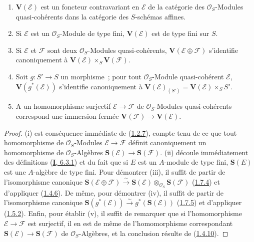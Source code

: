 \begin{proposition}[1.7.11]
\label{II.1.7.11-fr}
\begin{enumerate}
  \item[\rm(i)] $\mathbf{V}(\mathcal{E})$ est un foncteur contravariant en
    $\mathcal{E}$ de la catégorie des $\mathcal{O}_S$-Modules
    quasi-cohérents dans la catégorie des $S$-schémas affines.
  \item[\rm(ii)] Si $\mathcal{E}$ est un $\mathcal{O}_S$-Module de type
    fini, $\mathbf{V}(\mathcal{E})$ est de type fini sur $S$.
  \item[\rm(iii)] Si $\mathcal{E}$ et $\mathcal{F}$ sont deux
    $\mathcal{O}_S$-Modules quasi-cohérents,
    $\mathbf{V}(\mathcal{E}\oplus\mathcal{F})$ s'identifie canoniquement à
    $\mathbf{V}(\mathcal{E})\times_S\mathbf{V}(\mathcal{F})$.
  \item[\rm(iv)] Soit $g:S'\to S$ un morphisme~; pour tout
    $\mathcal{O}_S$-Module quasi-cohérent $\mathcal{E}$,
    $\mathbf{V}(g^*(\mathcal{E}))$ s'identifie canoniquement à
    $\mathbf{V}(\mathcal{E})_{(S')}
    =\mathbf{V}(\mathcal{E})\times_S S'$.
  \item[\rm(v)] A un homomorphisme surjectif
    $\mathcal{E}\to\mathcal{F}$ de $\mathcal{O}_S$-Modules quasi-cohérents
    correspond une immersion fermée
    $\mathbf{V}(\mathcal{F})\to\mathbf{V}(\mathcal{E})$.
\end{enumerate}
\end{proposition}

\begin{proof}
(i) est conséquence immédiate de
(\hyperref[II.1.2.7-fr]{1.2.7}), compte tenu de ce que tout homomorphisme de
$\mathcal{O}_S$-Modules $\mathcal{E}\to\mathcal{F}$ définit canoniquement un
homomorphisme de $\mathcal{O}_S$-Algèbres
$\mathbf{S}(\mathcal{E})\to\mathbf{S}(\mathcal{F})$. (ii) découle
immédiatement des définitions (\hyperref[I.6.3.1-fr]{\textbf{I}, 6.3.1}) et du fait
que si $E$ est un $A$-module de type fini, $\mathbf{S}(E)$ est une
$A$-algèbre de type fini. Pour démontrer (iii), il suffit de partir de
l'isomorphisme canonique
$\mathbf{S}(\mathcal{E}\oplus\mathcal{F})
\xrightarrow{\sim}\mathbf{S}(\mathcal{E})
\otimes_{\mathcal{O}_S}\mathbf{S}(\mathcal{F})$
(\hyperref[II.1.7.4-fr]{1.7.4}) et d'appliquer
(\hyperref[II.1.4.6-fr]{1.4.6}). De même, pour démontrer (iv), il suffit de
partir de l'isomorphisme canonique
$\mathbf{S}(g^*(\mathcal{E}))
\xrightarrow{\sim} g^*(\mathbf{S}(\mathcal{E}))$
(\hyperref[II.1.7.5-fr]{1.7.5}) et d'appliquer
(\hyperref[II.1.5.2-fr]{1.5.2}). Enfin, pour établir (v), il suffit de
remarquer que si l'homomorphisme $\mathcal{E}\to\mathcal{F}$ est surjectif,
il en est de même de l'homomorphisme correspondant
$\mathbf{S}(\mathcal{E})\to\mathbf{S}(\mathcal{F})$ de
$\mathcal{O}_S$-Algèbres, et la conclusion résulte de
(\hyperref[II.1.4.10-fr]{1.4.10}).
\end{proof}

